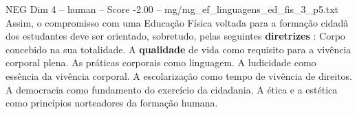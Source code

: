 \begin{textsample}{NEG Dim 4 – human – Score -2.00 – mg/mg\_ef\_linguagens\_ed\_fis\_3\_p5.txt}  \label{ex:f4_neg_013}
Assim, o compromisso com uma Educação Física voltada para a formação cidadã dos estudantes deve ser orientado, sobretudo, pelas seguintes \textbf{diretrizes} : Corpo concebido na sua totalidade.
A \textbf{qualidade} de vida como requisito para a vivência corporal plena.
As práticas corporais como linguagem.
A ludicidade como essência da vivência corporal.
A escolarização como tempo de vivência de direitos.
A democracia como fundamento do exercício da cidadania.
A ética e a estética como princípios norteadores da formação humana.

\end{textsample}
